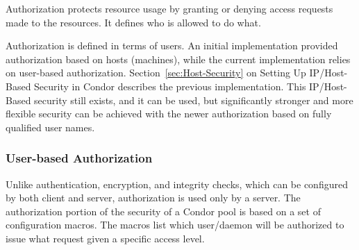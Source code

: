 Authorization protects resource usage by granting or denying
access requests made to the resources.
It defines who is allowed to do what.

Authorization is defined in terms of users.
An initial implementation provided authorization
based on hosts (machines), while the current implementation
relies on user-based authorization.
Section~\ref{sec:Host-Security}
on Setting Up IP/Host-Based Security in Condor describes the
previous implementation.
This IP/Host-Based security still exists, and it can be used,
but significantly stronger and more flexible
security can be achieved with the newer
authorization based on fully qualified user names.

\subsubsection{\label{sec:Security-UserAuthorization}User-based Authorization}


Unlike authentication, encryption, and integrity checks,
which can be configured by both client and server,
authorization is used only by a server.
The authorization portion of the security of a Condor pool is
based on a set of configuration macros.
The macros list which user/daemon will be authorized
to issue what request given a specific access level.

